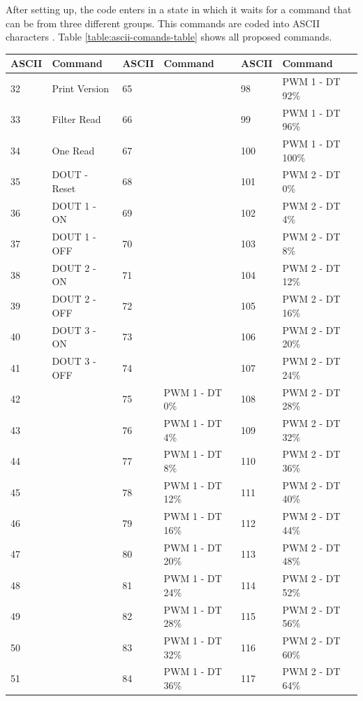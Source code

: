 	After setting up, the code enters in a state in which it waits for a command that can be from three different groups. This commands are coded into ASCII characters \cite{ascii}. Table \ref{table:ascii-comands-table} shows all proposed commands.

	\begin{table}[h!]
		\begin{tabular}{|l|l|l|l|l|l|}
		\hline
		\textbf{ASCII} & \textbf{Command} & \textbf{ASCII} & \textbf{Command} & \textbf{ASCII} & \textbf{Command} \\ \hline
		32 & Print Version & 65 &  & 98 & PWM 1 - DT 92\% \\ \hline
		33 & Filter Read & 66 &  & 99 & PWM 1 - DT 96\% \\ \hline
		34 & One Read & 67 &  & 100 & PWM 1 - DT 100\% \\ \hline
		35 & DOUT - Reset & 68 &  & 101 & PWM 2 - DT 0\% \\ \hline
		36 & DOUT 1 - ON & 69 &  & 102 & PWM 2 - DT 4\% \\ \hline
		37 & DOUT 1 - OFF & 70 &  & 103 & PWM 2 - DT 8\% \\ \hline
		38 & DOUT 2 - ON & 71 &  & 104 & PWM 2 - DT 12\% \\ \hline
		39 & DOUT 2 - OFF & 72 &  & 105 & PWM 2 - DT 16\% \\ \hline
		40 & DOUT 3 - ON & 73 &  & 106 & PWM 2 - DT 20\% \\ \hline
		41 & DOUT 3 - OFF & 74 &  & 107 & PWM 2 - DT 24\% \\ \hline
		42 &  & 75 & PWM 1 - DT 0\% & 108 & PWM 2 - DT 28\% \\ \hline
		43 &  & 76 & PWM 1 - DT 4\% & 109 & PWM 2 - DT 32\% \\ \hline
		44 &  & 77 & PWM 1 - DT 8\% & 110 & PWM 2 - DT 36\% \\ \hline
		45 &  & 78 & PWM 1 - DT 12\% & 111 & PWM 2 - DT 40\% \\ \hline
		46 &  & 79 & PWM 1 - DT 16\% & 112 & PWM 2 - DT 44\% \\ \hline
		47 &  & 80 & PWM 1 - DT 20\% & 113 & PWM 2 - DT 48\% \\ \hline
		48 &  & 81 & PWM 1 - DT 24\% & 114 & PWM 2 - DT 52\% \\ \hline
		49 &  & 82 & PWM 1 - DT 28\% & 115 & PWM 2 - DT 56\% \\ \hline
		50 &  & 83 & PWM 1 - DT 32\% & 116 & PWM 2 - DT 60\% \\ \hline
		51 &  & 84 & PWM 1 - DT 36\% & 117 & PWM 2 - DT 64\% \\ \hline

\end{tabular}
\end{table}

